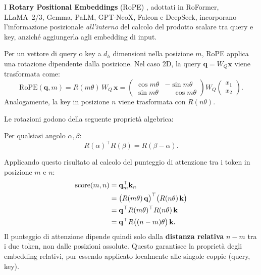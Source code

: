 I \textbf{Rotary Positional Embeddings} (RoPE) \citep{su2024rope}, adottati in
RoFormer, LLaMA~2/3, Gemma, PaLM, GPT-NeoX, Falcon e DeepSeek, incorporano
l'informazione posizionale \emph{all'interno} del calcolo del prodotto
scalare tra query e key, anziché aggiungerla agli embedding di input.

Per un vettore di query o key a $d_h$ dimensioni nella posizione $m$, RoPE
applica una rotazione dipendente dalla posizione. Nel caso 2D, la query
$\mathbf{q} = W_Q \mathbf{x}$ viene trasformata come:
\begin{equation}
  \text{RoPE}(\mathbf{q}, m) = R(m\theta)\, W_Q\, \mathbf{x}
  = \begin{pmatrix} \cos m\theta & -\sin m\theta \\
                    \sin m\theta & \phantom{-}\cos m\theta \end{pmatrix}
    W_Q \begin{pmatrix} x_1 \\ x_2 \end{pmatrix}.
  \label{eq:rope-query}
\end{equation}
Analogamente, la key in posizione $n$ viene trasformata con $R(n\theta)$.

Le rotazioni godono della seguente proprietà algebrica:

\begin{theorem}
Per qualsiasi angolo $\alpha, \beta$:
\begin{equation}
  R(\alpha)^\top R(\beta) = R(\beta - \alpha).
  \label{eq:rotation-product}
\end{equation}
\end{theorem}

Applicando questo risultato al calcolo del punteggio di attenzione tra i
token in posizione $m$ e $n$:
\begin{align}
  \text{score}(m, n)
    &= \mathbf{q}_m^\top \mathbf{k}_n \notag \\
    &= \bigl(R(m\theta)\,\mathbf{q}\bigr)^\top \bigl(R(n\theta)\,\mathbf{k}\bigr) \notag \\
    &= \mathbf{q}^\top R(m\theta)^\top R(n\theta)\,\mathbf{k} \notag \\
    &= \mathbf{q}^\top R\bigl((n-m)\theta\bigr)\,\mathbf{k}.
  \label{eq:rope-score}
\end{align}
Il punteggio di attenzione dipende quindi solo dalla \textbf{distanza
relativa} $n - m$ tra i due token, non dalle posizioni assolute. Questo
garantisce la proprietà degli embedding relativi, pur essendo applicato
localmente alle singole coppie (query, key).

